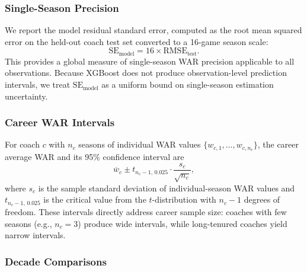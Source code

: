 \documentclass[USenglish]{article}
\theoremstyle{dgthm}
\theoremstyle{dgdef}
\begin{document}
\subsubsection{Single-Season Precision}\label{sec:single_season}

We report the model residual standard error, computed as the root mean squared error on the held-out coach test set converted to a 16-game season scale:
\begin{equation}
\text{SE}_{\text{model}} = 16 \times \text{RMSE}_{\text{test}}.
\label{eq:model_se}
\end{equation}
This provides a global measure of single-season WAR precision applicable to all observations. Because XGBoost does not produce observation-level prediction intervals, we treat $\text{SE}_{\text{model}}$ as a uniform bound on single-season estimation uncertainty.

\subsubsection{Career WAR Intervals}

For coach $c$ with $n_c$ seasons of individual WAR values $\{w_{c,1}, \ldots, w_{c,n_c}\}$, the career average WAR and its 95\% confidence interval are
\begin{equation}
\overline{w}_c \pm t_{n_c-1,\,0.025} \cdot \frac{s_c}{\sqrt{n_c}},
\label{eq:career_ci}
\end{equation}
where $s_c$ is the sample standard deviation of individual-season WAR values and $t_{n_c-1,\,0.025}$ is the critical value from the $t$-distribution with $n_c - 1$ degrees of freedom. These intervals directly address career sample size: coaches with few seasons (e.g., $n_c = 3$) produce wide intervals, while long-tenured coaches yield narrow intervals.

\subsubsection{Decade Comparisons}
\end{document}
